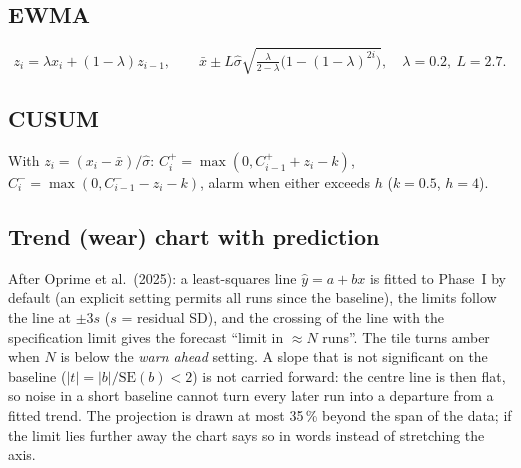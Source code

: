 


\subsection{EWMA}
\[ z_i=\lambda x_i+(1-\lambda)z_{i-1},\qquad \bar x\pm L\hat\sigma\sqrt{\tfrac{\lambda}{2-\lambda}\big(1-(1-\lambda)^{2i}\big)},\quad \lambda=0.2,\ L=2.7 . \]


\subsection{CUSUM}
With $z_i=(x_i-\bar x)/\hat\sigma$: $C^+_i=\max(0,C^+_{i-1}+z_i-k)$, $C^-_i=\max(0,C^-_{i-1}-z_i-k)$, alarm when either exceeds $h$ ($k=0.5$, $h=4$).


\subsection{Trend (wear) chart with prediction}
After Oprime et al.\ (2025): a least-squares line $\hat y=a+bx$ is fitted to Phase~I by default (an explicit setting permits all runs since the baseline),
the limits follow the line at $\pm3s$ ($s$ = residual SD), and the crossing of the line with the specification limit gives the
forecast ``limit in $\approx N$ runs''. The tile turns amber when $N$ is below the \emph{warn ahead} setting. A slope that is
not significant on the baseline ($|t|=|b|/\mathrm{SE}(b)<2$) is not carried forward: the centre line is then flat, so noise in a
short baseline cannot turn every later run into a departure from a fitted trend. The projection is drawn at most 35\,\% beyond
the span of the data; if the limit lies further away the chart says so in words instead of stretching the axis.


